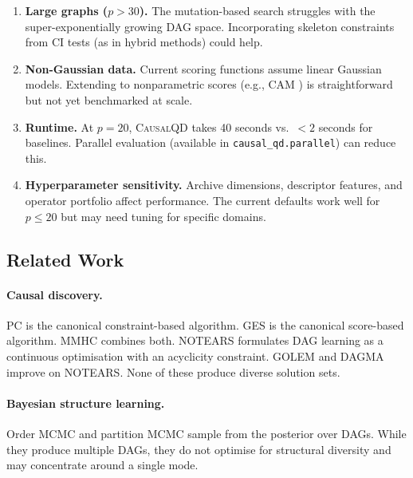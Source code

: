 \documentclass[11pt,a4paper]{article}
\begin{document}
\begin{enumerate}[leftmargin=*]
    \item \textbf{Large graphs ($p > 30$).} The mutation-based search struggles with the super-exponentially growing DAG space. Incorporating skeleton constraints from CI tests (as in hybrid methods) could help.
    
    \item \textbf{Non-Gaussian data.} Current scoring functions assume linear Gaussian models. Extending to nonparametric scores (e.g., CAM \citep{buhlmann2014cam}) is straightforward but not yet benchmarked at scale.
    
    \item \textbf{Runtime.} At $p = 20$, \textsc{CausalQD} takes 40 seconds vs.\ $<2$ seconds for baselines. Parallel evaluation (available in \texttt{causal\_qd.parallel}) can reduce this.
    
    \item \textbf{Hyperparameter sensitivity.} Archive dimensions, descriptor features, and operator portfolio affect performance. The current defaults work well for $p \leq 20$ but may need tuning for specific domains.
\end{enumerate}

\subsection{Related Work}

\paragraph{Causal discovery.}
PC \citep{spirtes2000causation} is the canonical constraint-based algorithm. GES \citep{chickering2002optimal} is the canonical score-based algorithm. MMHC \citep{tsamardinos2006max} combines both. NOTEARS \citep{zheng2018dags} formulates DAG learning as a continuous optimisation with an acyclicity constraint. GOLEM \citep{ng2020role} and DAGMA \citep{bello2022dagma} improve on NOTEARS. None of these produce diverse solution sets.

\paragraph{Bayesian structure learning.}
Order MCMC \citep{friedman2003being} and partition MCMC \citep{kuipers2017partition} sample from the posterior over DAGs. While they produce multiple DAGs, they do not optimise for structural diversity and may concentrate around a single mode.
\end{document}

